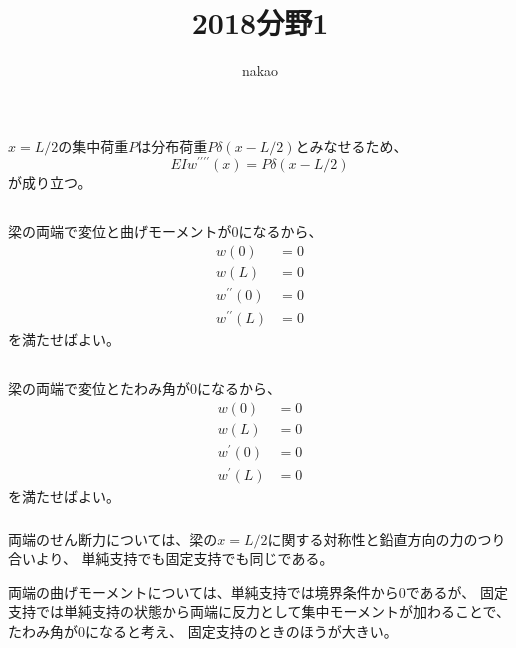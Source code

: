 \documentclass[a4paper]{jsarticle}
\begin{document}
\title{2018分野1}
\author{nakao}
\maketitle

\section{}
\subsection{}
$x = L/2$の集中荷重$P$は分布荷重$P \delta (x - L/2)$とみなせるため、
\begin{equation}
  E I w^{\prime \prime \prime \prime}(x) = P \delta (x - L/2)
\end{equation}
が成り立つ。

\subsection{}
梁の両端で変位と曲げモーメントが0になるから、
\begin{align}
  w(0) &= 0 \\
  w(L) &= 0 \\
  w^{\prime \prime}(0) &= 0 \\
  w^{\prime \prime}(L) &= 0
\end{align}
を満たせばよい。

\subsection{}
\subsubsection{}
梁の両端で変位とたわみ角が0になるから、
\begin{align}
  w(0) &= 0 \\
  w(L) &= 0 \\
  w^{\prime}(0) &= 0 \\
  w^{\prime}(L) &= 0
\end{align}
を満たせばよい。

\subsubsection{}
両端のせん断力については、梁の$x = L/2$に関する対称性と鉛直方向の力のつり合いより、
単純支持でも固定支持でも同じである。\par
両端の曲げモーメントについては、単純支持では境界条件から0であるが、
固定支持では単純支持の状態から両端に反力として集中モーメントが加わることで、たわみ角が0になると考え、
固定支持のときのほうが大きい。
\end{document}
